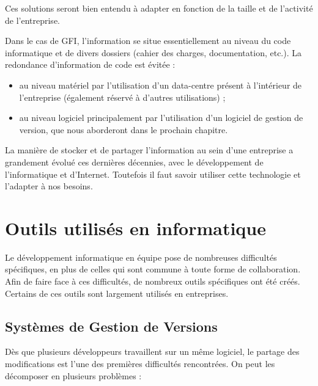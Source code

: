 Ces solutions seront bien entendu à adapter en fonction de la taille et de l'activité de l'entreprise.

\begin{app}
Dans le cas de GFI, l'information se situe essentiellement au niveau du code informatique et de divers dossiers (cahier des charges, documentation, etc.). La redondance d'information de code est évitée :
\begin{itemize}
\item au niveau matériel par l'utilisation d'un data-centre présent à l'intérieur de l'entreprise (également réservé à d'autres utilisations) ;
\item au niveau logiciel principalement par l'utilisation d'un logiciel de gestion de version, que nous aborderont dans le prochain chapitre.
\end{itemize}
\end{app}

La manière de stocker et de partager l'information au sein d'une entreprise a grandement évolué ces dernières décennies, avec le développement de l'informatique et d'Internet. Toutefois il faut savoir utiliser cette technologie et l'adapter à nos besoins.

\section{Outils utilisés en informatique}

Le développement informatique en équipe pose de nombreuses difficultés spécifiques, en plus de celles qui sont commune à toute forme de collaboration. Afin de faire face à ces difficultés, de nombreux outils spécifiques ont été créés. Certains de ces outils sont largement utilisés en entreprises.

\subsection{Systèmes de Gestion de Versions}

Dès que plusieurs développeurs travaillent sur un même logiciel, le partage des modifications est l'une des premières difficultés rencontrées. On peut les décomposer en plusieurs problèmes :

